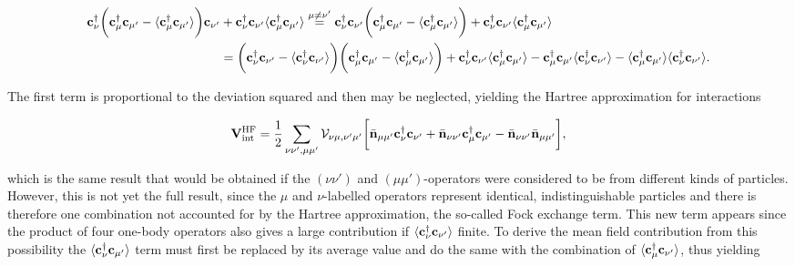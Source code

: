 \documentclass{homework}
\begin{document}
\begin{equation}
    \begin{split}
    {\bf c}_{\nu}^\dagger \bigg({\bf c}_{\mu}^\dagger {\bf c}_{\mu'} - \langle {\bf c}_{\mu}^\dagger {\bf c}_{\mu'} \rangle \bigg) {\bf c}_{\nu'} &+ {\bf c}_{\nu}^\dagger {\bf c}_{\nu'} \langle {\bf c}_{\mu}^\dagger {\bf c}_{\mu'}\rangle \overset{{\mu \neq \nu'}}{=} {\bf c}_{\nu}^\dagger {\bf c}_{\nu'} \bigg({\bf c}_{\mu}^\dagger {\bf c}_{\mu'} - \langle {\bf c}_{\mu}^\dagger {\bf c}_{\mu'} \rangle \bigg) + {\bf c}_{\nu}^\dagger {\bf c}_{\nu'} \langle {\bf c}_{\mu}^\dagger {\bf c}_{\mu'}\rangle \\
    &= \bigg({\bf c}_{\nu}^\dagger {\bf c}_{\nu'} - \langle {\bf c}_{\nu}^\dagger {\bf c}_{\nu'} \rangle\bigg) \bigg({\bf c}_{\mu}^\dagger {\bf c}_{\mu'} - \langle {\bf c}_{\mu}^\dagger {\bf c}_{\mu'} \rangle \bigg) + {\bf c}_{\nu}^\dagger {\bf c}_{\nu'} \langle {\bf c}_{\mu}^\dagger {\bf c}_{\mu'}\rangle - {\bf c}_{\mu}^\dagger {\bf c}_{\mu'} \langle {\bf c}_{\nu}^\dagger {\bf c}_{\nu'} \rangle - \langle {\bf c}_{\mu}^\dagger {\bf c}_{\mu'} \rangle \langle {\bf c}_{\nu}^\dagger {\bf c}_{\nu'} \rangle.
    \end{split}
\end{equation}

The first term is proportional to the deviation squared and then may be neglected, yielding the Hartree approximation for interactions

\begin{equation}
\begin{split}
    {\bf V}_{\textnormal{int}}^{\textnormal{HF}} = \frac{1}{2} \sum_{\nu\nu', \mu\mu'} {\mathcal V}_{\nu\mu, \nu'\mu'} \bigg[ \bar{\bf n}_{\mu \mu'} {\bf c}_{\nu}^\dagger {\bf c}_{\nu'} + \bar{\bf n}_{\nu \nu'} {\bf c}_{\mu}^\dagger {\bf c}_{\mu'} - \bar{\bf n}_{\nu \nu'} \bar{\bf n}_{\mu \mu'}\bigg],
\end{split}
\end{equation}

which is the same result that would be obtained if the $(\nu \nu')$ and $(\mu \mu')$-operators were considered to be from different kinds of particles. However, this is not yet the full result, since the $\mu$ and $\nu$-labelled operators represent identical, indistinguishable particles and there is therefore one combination not accounted for by the Hartree approximation, the so-called Fock exchange term. This new term appears since the product of four one-body operators also gives a large contribution if $\langle{\bf c}_{\nu}^\dagger {\bf c}_{\nu'} \rangle$ finite. To derive the mean field contribution from this possibility the $\langle {\bf c}_{\nu}^\dagger {\bf c}_{\mu'} \rangle$ term must first be replaced by its average value and do the same with the combination of $\langle {\bf c}_{\mu}^\dagger {\bf c}_{\nu'} \rangle$, thus yielding 
\end{document}
